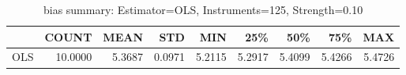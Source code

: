 \begin{table}[ht]
\centering
\caption{bias summary: Estimator=OLS, Instruments=125, Strength=0.10}
\begin{tabular}{lrrrrrrrr}
\toprule
 & COUNT & MEAN & STD & MIN & 25\% & 50\% & 75\% & MAX \\
\midrule
OLS & 10.0000 & 5.3687 & 0.0971 & 5.2115 & 5.2917 & 5.4099 & 5.4266 & 5.4726 \\
\bottomrule
\end{tabular}
\end{table}
